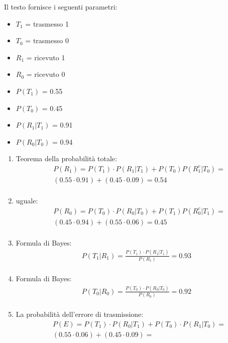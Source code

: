 \documentclass[12pt]{article}
\begin{document}
Il testo fornisce i seguenti parametri:
\begin{itemize}
    \item \(T_1\) = trasmesso 1
    \item \(T_0\) = trasmesso 0
    \item \(R_1\) = ricevuto 1
    \item \(R_0\) = ricevuto 0
    \item \(P(T_1)\) = 0.55
    \item \(P(T_0)\) = 0.45
    \item \(P(R_1|T_1)\) = 0.91
    \item \(P(R_0|T_0)\) = 0.94
\end{itemize}
\begin{enumerate}
    \item Teorema della probabilità totale:
    \begin{align*}
        &P(R_1) = P(T_1)\cdot P(R_1|T_1)+P(T_0)P(R_1^c|T_0) = \\
        &(0.55 \cdot 0.91) + (0.45 \cdot 0.09) = 0.54 \\
    \end{align*}
    \item uguale:
    \begin{align*}
        &P(R_0) = P(T_0)\cdot P(R_0|T_0)+P(T_1)P(R_0^c|T_1) = \\
        &(0.45 \cdot 0.94) + (0.55 \cdot 0.06) = 0.45 \\
    \end{align*}
    \item Formula di Bayes:
    \begin{align*}
        P(T_1|R_1) = \frac{P(T_1) \cdot P(R_1|T_1)}{P(R_1)} = 0.93 \\
    \end{align*}
    \item Formula di Bayes:
    \begin{align*}
        P(T_0|R_0) = \frac{P(T_0) \cdot P(R_0|T_0)}{P(R_0)} = 0.92 \\
    \end{align*}
    \item La probabilità dell'errore di trasmissione:
    \begin{align*}
        &P(E) = P(T_1)\cdot P(R_0|T_1)+P(T_0)\cdot P(R_1|T_0) = \\
        &(0.55 \cdot 0.06) + (0.45 \cdot 0.09) = 
    \end{align*}
\end{enumerate}
\end{document}
